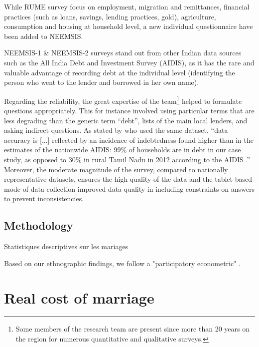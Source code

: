 \documentclass[a4paper, 11pt, onecolumn]{article}
\begin{document}
While RUME survey focus on employment, migration and remittances, financial practices (such as loans, savings, lending practices, gold), agriculture, consumption and housing at household level, a new individual questionnaire have been added to NEEMSIS.


NEEMSIS-1 \& NEEMSIS-2 surveys stand out from other Indian data sources such as the All India Debt and Investment Survey (AIDIS), as it has the rare and valuable advantage of recording debt at the individual level (identifying the person who went to the lender and borrowed in her own name).

Regarding the reliability, the great expertise of the team\footnote{Some members of the research team are present since more than 20 years on the region for numerous quantitative and qualitative surveys.} helped to formulate questions appropriately.
This for instance involved using particular terms that are less degrading than the generic term ``debt'', lists of the main local lenders, and asking indirect questions.
As stated by \cite{Reboul2021} who used the same dataset, ``data accuracy is [...] reflected by an incidence of indebtedness found higher than in the estimates of the nationwide AIDIS: 99\% of households are in debt in our case study, as opposed to 30\% in rural Tamil Nadu in 2012 according to the AIDIS \citep{NSSO2014}.'' 
Moreover, the moderate magnitude of the survey, compared to nationally representative datasets, ensures the high quality of the data and the tablet-based mode of data collection improved data quality in including constraints on answers to prevent inconsistencies. 



	
	
	
	\subsection{Methodology}

Statistiques descriptives sur les mariages


Based on our ethnographic findings, we follow a "participatory econometric" \cite{Rao1997, Rao2002}.







\section{Real cost of marriage}
\end{document}
